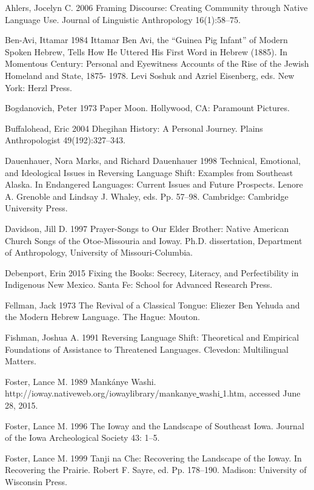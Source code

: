 \documentclass[output=paper]{LSP/langsci}
\begin{document}
\begin{reflist}

Ahlers, Jocelyn C. 2006 Framing Discourse: Creating Community through Native Language Use. Journal of Linguistic Anthropology 16(1):58--75.

Ben-Avi, Ittamar 1984 Ittamar Ben Avi, the ``Guinea Pig Infant'' of Modern Spoken Hebrew, Tells How He Uttered His First Word in Hebrew (1885). In Momentous Century: 	Personal and Eyewitness Accounts of the Rise of the Jewish Homeland and State, 1875-	1978. Levi Soshuk and Azriel Eisenberg, eds. New York: Herzl Press.

Bogdanovich, Peter 1973 Paper Moon. Hollywood, CA: Paramount Pictures.

Buffalohead, Eric 2004 Dhegihan History: A Personal Journey. Plains Anthropologist 49(192):327--343.

Dauenhauer, Nora Marks, and Richard Dauenhauer 1998 Technical, Emotional, and Ideological Issues in Reversing Language Shift: Examples from Southeast Alaska. In Endangered Languages: Current Issues and Future Prospects. Lenore A. Grenoble and Lindsay J. Whaley, eds. Pp. 57--98. Cambridge: Cambridge University Press.

Davidson, Jill D. 1997 Prayer-Songs to Our Elder Brother: Native American Church Songs of the Otoe-Missouria and Ioway. Ph.D. dissertation, Department of Anthropology, University of Missouri-Columbia.

Debenport, Erin 2015 Fixing the Books: Secrecy, Literacy, and Perfectibility in Indigenous New Mexico. Santa Fe: School for Advanced Research Press.

Fellman, Jack 1973 The Revival of a Classical Tongue: Eliezer Ben Yehuda and the Modern Hebrew Language. The Hague: Mouton.

Fishman, Joshua A. 1991 Reversing Language Shift: Theoretical and Empirical Foundations of Assistance to Threatened Languages. Clevedon: Multilingual Matters.

Foster, Lance M. 1989 Mank\'anye Washi. http://ioway.nativeweb.org/iowaylibrary/mankanye\underline{ }washi\underline{ }1.htm, accessed June 28, 2015.

Foster, Lance M. 1996 The Ioway and the Landscape of Southeast Iowa. Journal of the Iowa Archeological Society 43: 1--5.

Foster, Lance M. 1999 Tanji na Che: Recovering the Landscape of the Ioway. In Recovering the Prairie. Robert F. Sayre, ed. Pp. 178--190. Madison: University of Wisconsin Press.


\end{reflist}
\end{document}
